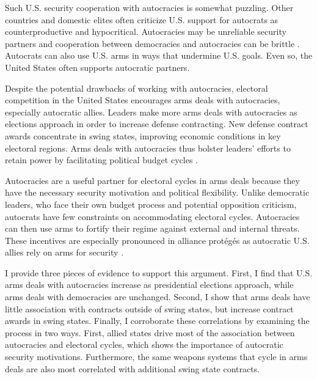 \documentclass[12pt]{article}
\begin{document}
Such U.S. security cooperation with autocracies is somewhat puzzling.
Other countries and domestic elites often criticize U.S. support for autocrats as counterproductive and hypocritical. 
Autocracies may be unreliable security partners \citep{Gaubatz1996} and cooperation between democracies and autocracies can be brittle \citep{Leeds1999}.
Autocrats can also use U.S. arms in ways that undermine U.S. goals. 
Even so, the United States often supports autocratic partners.  


Despite the potential drawbacks of working with autocracies, electoral competition in the United States encourages arms deals with autocracies, especially autocratic allies.
Leaders make more arms deals with autocracies as elections approach in order to increase defense contracting.
New defense contract awards concentrate in swing states, improving economic conditions in key electoral regions.
Arms deals with autocracies thus bolster leaders' efforts to retain power by facilitating political budget cycles \citep{Tufte1978, Mintz1988, Mayer1995, DerouenHeo2000, Becker2021}. 


Autocracies are a useful partner for electoral cycles in arms deals because they have the necessary security motivation and political flexibility. 
Unlike democratic leaders, who face their own budget process and potential opposition criticism, autocrats have few constraints on accommodating electoral cycles.
Autocracies can then use arms to fortify their regime against external and internal threats.
These incentives are especially pronounced in alliance prot{\'e}g{\'e}s as autocratic U.S. allies rely on arms for security \citep{McManusYarhi-Milo2017}.


I provide three pieces of evidence to support this argument.
First, I find that U.S. arms deals with autocracies increase as presidential elections approach, while arms deals with democracies are unchanged. 
Second, I show that arms deals have little association with contracts outside of swing states, but increase contract awards in swing states. 
Finally, I corroborate these correlations by examining the process in two ways.
First, allied states drive most of the association between autocracies and electoral cycles, which shows the importance of autocratic security motivations. 
Furthermore, the same weapons systems that cycle in arms deals are also most correlated with additional swing state contracts.
\end{document}
